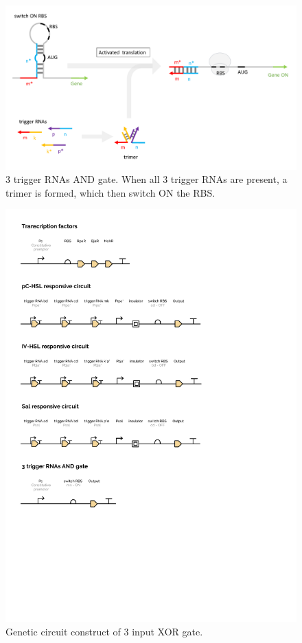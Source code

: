 \documentclass[12pt,notitlepage]{article}
\begin{document}
\begin{figure}
    \centering
    \includegraphics[width=\textwidth]{xor_ribocomputing/3_trigger_rna_on.pdf}
    \caption{%
    3 trigger RNAs AND gate. When all 3 trigger RNAs are present, a trimer is formed, which then switch ON the RBS.}
    \label{f:3_RNA_on_RBS}
\end{figure}
    
\begin{figure}
    \centering
    \includegraphics{xor_ribocomputing/plot-3.pdf}
    \caption{Genetic circuit construct of 3 input XOR gate.}
    \label{f:p_construct_xor}
\end{figure}
\end{document}
